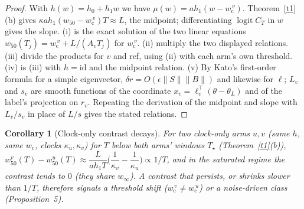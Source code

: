 \documentclass[11pt]{article}
\newtheorem{corollary}{Corollary}
\theoremstyle{definition}
\theoremstyle{remark}
\newcommand{\wcrit}{w_{\mathrm c}}
\newcommand{\wfifty}{w_{50}}
\newcommand{\Tstar}{T_\star}
\newcommand{\logit}{\operatorname{logit}}
\begin{document}
\begin{proof}
With $h(w)=h_0+h_1w$ we have $\mu(w)=ah_1(w-\wcrit^{\,v})$. Theorem~\ref{t1}(b) gives $\kappa ah_1(\wfifty-\wcrit^{\,v})T\approx L$, the midpoint; differentiating $\logit C_T$ in $w$ gives the slope. (i) is the exact solution of the two linear equations $\wfifty(T_j)=\wcrit^{\,v}+L/(A_vT_j)$ for $\wcrit^{\,v}$. (ii) multiply the two displayed relations. (iii) divide the products for $v$ and ref, using (ii) with each arm's own threshold. (iv) is (iii) with $h=\mathrm{id}$ and the midpoint relation. (v) By Kato's first-order formula for a simple eigenvector, $\delta r=O(\epsilon\|S\|\|B\|)$ and likewise for $\ell$; $L_v$ and $s_v$ are smooth functions of the coordinate $x_v=\ell_v^\top(\theta-\theta_L)$ and of the label's projection on $r_v$. Repeating the derivation of the midpoint and slope with $L_v/s_v$ in place of $L/s$ gives the stated relations.
\end{proof}

\begin{corollary}[Clock-only contrast decays]\label{c3}
For two clock-only arms $u,v$ (same $h$, same $\wcrit$, clocks $\kappa_u,\kappa_v$) for $T$ below both arms' windows $\Tstar$ (Theorem~\ref{t1}(b)), $\wfifty^{v}(T)-\wfifty^{u}(T)\approx\dfrac{L}{a h_1T}\Big(\dfrac1{\kappa_v}-\dfrac1{\kappa_u}\Big)\propto1/T$, and in the saturated regime the contrast tends to $0$ (they share $w_\infty$). A contrast that persists, or shrinks slower than $1/T$, therefore signals a threshold shift ($\wcrit^{\,v}\ne\wcrit^{\,u}$) or a noise-driven class (Proposition~5).
\end{corollary}
\end{document}
